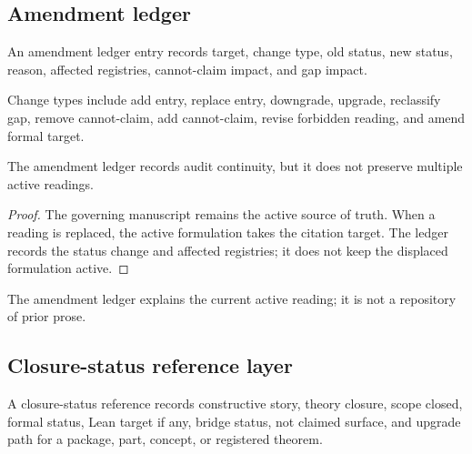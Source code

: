 \subsection{Amendment ledger}
\label{subsec:philosophy-amendment-ledger}

\begin{definition}
\label{def:philosophy-amendment-ledger-entry}
An amendment ledger entry records target, change type, old status, new
status, reason, affected registries, cannot-claim impact, and gap
impact.
\end{definition}

\begin{definition}
\label{def:philosophy-amendment-change-type}
Change types include add entry, replace entry, downgrade, upgrade,
reclassify gap, remove cannot-claim, add cannot-claim, revise
forbidden reading, and amend formal target.
\end{definition}

\begin{theorem}
\label{thm:philosophy-amendment-ledger-no-parallel-readings}
The amendment ledger records audit continuity, but it does not preserve
multiple active readings.
\end{theorem}
\begin{proof}
The governing manuscript remains the active source of truth. When a
reading is replaced, the active formulation takes the citation target.
The ledger records the status change and affected registries; it does
not keep the displaced formulation active.
\end{proof}

\begin{corollary}
\label{cor:philosophy-amendment-ledger-not-archive}
The amendment ledger explains the current active reading; it is not a
repository of prior prose.
\end{corollary}

\subsection{Closure-status reference layer}
\label{subsec:philosophy-closure-status-reference-layer}

\begin{definition}
\label{def:philosophy-closure-status-reference}
A closure-status reference records constructive story, theory closure,
scope closed, formal status, Lean target if any, bridge status, not
claimed surface, and upgrade path for a package, part, concept, or
registered theorem.
\end{definition}

